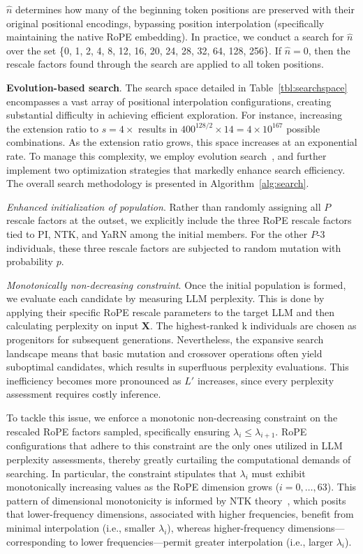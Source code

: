 $\hat{n}$ determines how many of the beginning token positions are preserved with their original positional encodings, bypassing position interpolation (specifically maintaining the native RoPE embedding). In practice, we conduct a search for $\hat{n}$ over the set \{0, 1, 2, 4, 8, 12, 16, 20, 24, 28, 32, 64, 128, 256\}. If $\hat{n}=0$, then the rescale factors found through the search are applied to all token positions.

\textbf{Evolution-based search}. The search space detailed in Table~\ref{tbl:searchspace} encompasses a vast array of positional interpolation configurations, creating substantial difficulty in achieving efficient exploration. For instance, increasing the extension ratio to $s=4\times$ results in $400^{128/2}\times14=4\times10^{167}$ possible combinations. As the extension ratio grows, this space increases at an exponential rate. To manage this complexity, we employ evolution search~\cite{guo2020single}, and further implement two optimization strategies that markedly enhance search efficiency. The overall search methodology is presented in Algorithm~\ref{alg:search}.

\textit{Enhanced initialization of population}. Rather than randomly assigning all $P$ rescale factors at the outset, we explicitly include the three RoPE rescale factors tied to PI, NTK, and YaRN among the initial members. For the other $P$-3 individuals, these three rescale factors are subjected to random mutation with probability $p$.

\textit{Monotonically non-decreasing constraint}. Once the initial population is formed, we evaluate each candidate by measuring LLM perplexity. This is done by applying their specific RoPE rescale parameters to the target LLM and then calculating perplexity on input $\mathbf{X}$. The highest-ranked k individuals are chosen as progenitors for subsequent generations. Nevertheless, the expansive search landscape means that basic mutation and crossover operations often yield suboptimal candidates, which results in superfluous perplexity evaluations. This inefficiency becomes more pronounced as $L'$ increases, since every perplexity assessment requires costly inference.

To tackle this issue, we enforce a monotonic non-decreasing constraint on the rescaled RoPE factors sampled, specifically ensuring $\lambda_i\le \lambda_{i+1}$. RoPE configurations that adhere to this constraint are the only ones utilized in LLM perplexity assessments, thereby greatly curtailing the computational demands of searching. In particular, the constraint stipulates that $\lambda_i$ must exhibit monotonically increasing values as the RoPE dimension grows ($i = 0,\ldots,63$). This pattern of dimensional monotonicity is informed by NTK theory~\cite{jacot2018neural,tancik2020fourier,ntk}, which posits that lower-frequency dimensions, associated with higher frequencies, benefit from minimal interpolation (i.e., smaller $\lambda_i$), whereas higher-frequency dimensions—corresponding to lower frequencies—permit greater interpolation (i.e., larger $\lambda_i$).

